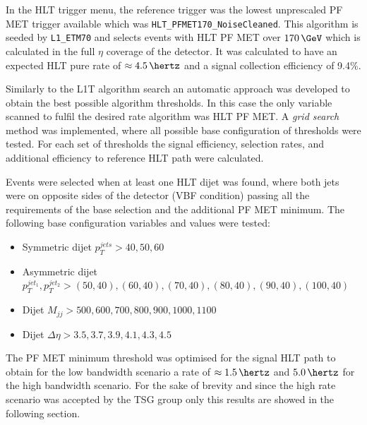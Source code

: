 
In the \gls{HLT} trigger menu, the reference trigger was the lowest unprescaled \gls{PF} \gls{MET} trigger available which was \verb|HLT_PFMET170_NoiseCleaned|. This algorithm is seeded by \verb|L1_ETM70| and selects events with \gls{HLT} \gls{PF} \gls{MET} over $170\,\GeV$ which is calculated in the full $\eta$ coverage of the detector. It was calculated to have an expected \gls{HLT} pure rate of $\approx 4.5\,\hertz$ and a signal collection efficiency of 9.4\%. 

Similarly to the \gls{L1T} algorithm search an automatic approach was developed to obtain the best possible algorithm thresholds. In this case the only variable scanned to fulfil the desired rate algorithm was \gls{HLT} \gls{PF} \gls{MET}. A \textit{grid search} method was implemented, where all possible base configuration of thresholds were tested. For each set of thresholds the signal efficiency, selection rates, and additional efficiency to reference \gls{HLT} path were calculated. 

Events were selected when at least one \gls{HLT} dijet was found, where both jets were on opposite sides of the detector (\gls{VBF} condition) passing all the requirements of the base selection and the additional \gls{PF} \gls{MET} minimum. The following base configuration variables and values were tested:

\begin{itemize}
  \item Symmetric dijet $p_T^{jets}>{40,50,60}$
  \item Asymmetric dijet $p_T^{jet_1},p_T^{jet_2}>{(50,40),(60,40),(70,40),(80,40),(90,40),(100,40)}$
  \item Dijet $M_{jj}>{500,600,700,800,900,1000,1100}$
  \item Dijet $\Delta\eta>{3.5,3.7,3.9,4.1,4.3,4.5}$
\end{itemize}

The \gls{PF} \gls{MET} minimum threshold was optimised for the signal \gls{HLT} path to obtain for the low bandwidth scenario a rate of $\approx 1.5\,\hertz$ and $5.0\,\hertz$ for the high bandwidth scenario. For the sake of brevity and since the high rate scenario was accepted by the \gls{TSG} group only this results are showed in the following section.

